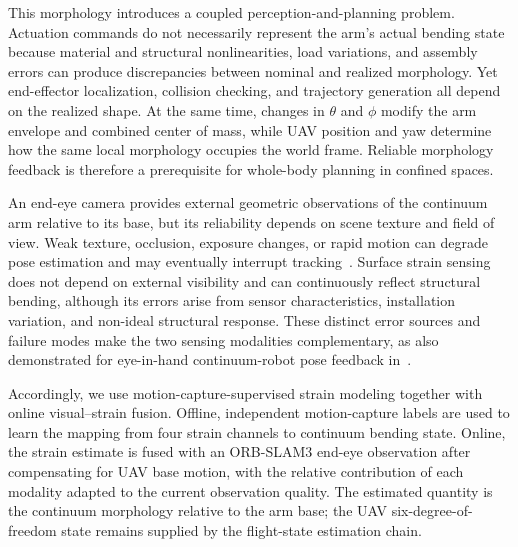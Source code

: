 \documentclass[journal,twoside]{IEEEtran}
\begin{document}
This morphology introduces a coupled perception-and-planning problem. Actuation commands do not necessarily represent the arm's actual bending state because material and structural nonlinearities, load variations, and assembly errors can produce discrepancies between nominal and realized morphology. Yet end-effector localization, collision checking, and trajectory generation all depend on the realized shape. At the same time, changes in $\theta$ and $\phi$ modify the arm envelope and combined center of mass, while UAV position and yaw determine how the same local morphology occupies the world frame. Reliable morphology feedback is therefore a prerequisite for whole-body planning in confined spaces.

An end-eye camera provides external geometric observations of the continuum arm relative to its base, but its reliability depends on scene texture and field of view. Weak texture, occlusion, exposure changes, or rapid motion can degrade pose estimation and may eventually interrupt tracking~\cite{campos2021orbslam3}. Surface strain sensing does not depend on external visibility and can continuously reflect structural bending, although its errors arise from sensor characteristics, installation variation, and non-ideal structural response. These distinct error sources and failure modes make the two sensing modalities complementary, as also demonstrated for eye-in-hand continuum-robot pose feedback in~\cite{wang2023visualstrain}.

Accordingly, we use motion-capture-supervised strain modeling together with online visual--strain fusion. Offline, independent motion-capture labels are used to learn the mapping from four strain channels to continuum bending state. Online, the strain estimate is fused with an ORB-SLAM3 end-eye observation after compensating for UAV base motion, with the relative contribution of each modality adapted to the current observation quality. The estimated quantity is the continuum morphology relative to the arm base; the UAV six-degree-of-freedom state remains supplied by the flight-state estimation chain.
\end{document}
